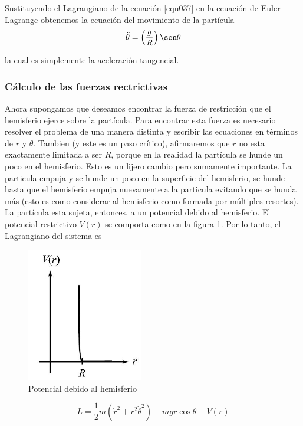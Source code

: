\documentclass[12pt]{book}
\theoremstyle{definition}
\theoremstyle{remark}
\theoremstyle{plain}
\begin{document}
Sustituyendo el Lagrangiano de la ecuación \ref{equ037} en la ecuación de Euler- Lagrange obtenemos la ecuación del movimiento de la partícula
\begin{equation}
\label{equ038}
\ddot{\theta}=\left ( \frac{g}{R} \right ) \sen \theta 
\end{equation}

la cual es simplemente la aceleración tangencial.

\subsubsection{Cálculo de las fuerzas rectrictivas}

Ahora supongamos que deseamos encontrar la fuerza de restricción que el hemisferio ejerce sobre la partícula. Para encontrar esta fuerza es necesario resolver el problema de una manera distinta y escribir las ecuaciones en términos de $r$ y $\theta$. Tambien (y este es un paso crítico), afirmaremos que $r$ no esta exactamente limitada a ser $R$, porque en la realidad la partícula se hunde un poco en el hemisferio. Esto es un lijero cambio pero sumamente importante. La particula empuja y se hunde un poco en la superficie del hemisferio, se hunde hasta que el hemisferio empuja nuevamente a la particula evitando que se hunda más (esto es como considerar al hemisferio como formada por múltiples resortes). La partícula esta sujeta, entonces, a un potencial debido al hemisferio. El potencial restrictivo $V(r)$ se comporta como en la figura \ref{fig104}. Por lo tanto, el Lagrangiano del sistema es

\begin{figure}
\centering
\includegraphics[width=2in]{Potencialhemisferio.jpg}
\caption{Potencial debido al hemisferio}
\label{fig104}
\end{figure}

\begin{equation}
\label{equ039}
L = \frac{1}{2} m (\dot{r}^2 + r^2 \dot{\theta}^2)-m g r \cos \theta - V(r)
\end{equation}
\end{document}
